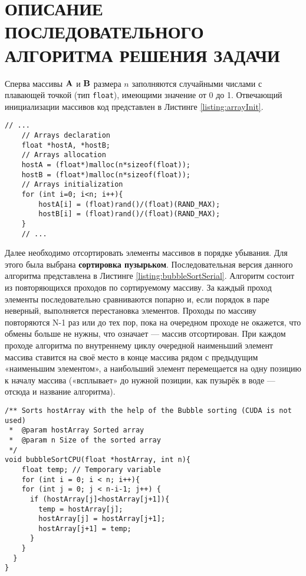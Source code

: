 \section{ОПИСАНИЕ ПОСЛЕДОВАТЕЛЬНОГО АЛГОРИТМА РЕШЕНИЯ ЗАДАЧИ}

Сперва массивы $\vb{A}$ и $\vb{B}$ размера $n$ заполняются случайными числами с плавающей точкой (тип \texttt{float}), имеющими значение от 0 до 1. Отвечающий инициализации массивов код представлен в Листинге \ref{listing:arrayInit}.
\begin{lstlisting}[style=CStyle, label={listing:arrayInit}, caption={Инициализация массивов $\vb{A}$ и $\vb{B}$ размера $n$ случайными числами с плавающей точкой (тип \texttt{float}), имеющими значение от 0 до 1.}]
	// ...
	// Arrays declaration
	float *hostA, *hostB;
	// Arrays allocation
	hostA = (float*)malloc(n*sizeof(float));
	hostB = (float*)malloc(n*sizeof(float));
	// Arrays initialization
	for (int i=0; i<n; i++){
		hostA[i] = (float)rand()/(float)(RAND_MAX);
		hostB[i] = (float)rand()/(float)(RAND_MAX);
	}
	// ...
\end{lstlisting}

Далее необходимо отсортировать элементы массивов в порядке убывания. Для этого была выбрана \textbf{сортировка пузырьком}. Последовательная версия данного алгоритма представлена в Листинге \ref{listing:bubbleSortSerial}. 
Алгоритм состоит из повторяющихся проходов по сортируемому массиву. За каждый проход элементы последовательно сравниваются попарно и, если порядок в паре неверный, выполняется перестановка элементов. Проходы по массиву повторяются N-1 раз или до тех пор, пока на очередном проходе не окажется, что обмены больше не нужны, что означает — массив отсортирован. При каждом проходе алгоритма по внутреннему циклу очередной наименьший элемент массива ставится на своё место в конце массива рядом с предыдущим «наименьшим элементом», а наибольший элемент перемещается на одну позицию к началу массива («всплывает» до нужной позиции, как пузырёк в воде — отсюда и название алгоритма). 
\begin{lstlisting}[style=CStyle, label={listing:bubbleSortSerial}, caption={Последовательная версия сортировки пузырьком.}]
/** Sorts hostArray with the help of the Bubble sorting (CUDA is not used)
 *	@param hostArray Sorted array
 *	@param n Size of the sorted array
 */
void bubbleSortCPU(float *hostArray, int n){
	float temp; // Temporary variable
	for (int i = 0; i < n; i++){
    for (int j = 0; j < n-i-1; j++) {
      if (hostArray[j]<hostArray[j+1]){
        temp = hostArray[j];
        hostArray[j] = hostArray[j+1];
        hostArray[j+1] = temp;
      }
    }
  }
}
\end{lstlisting}

